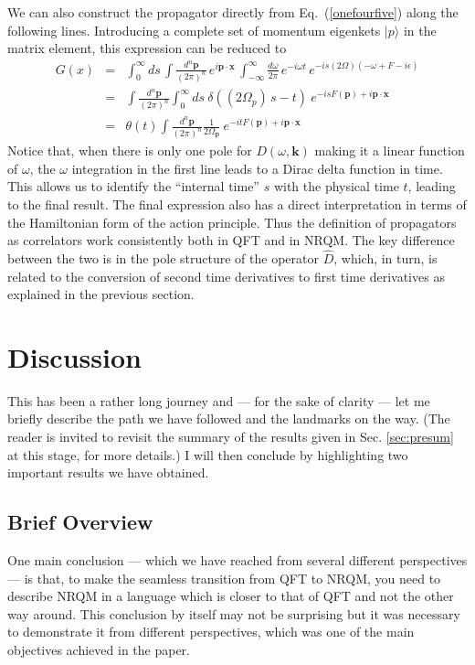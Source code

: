 \documentclass{article}
\def\eq#1{{Eq.~(\ref{#1})}}
\def\ket#1{|#1\rangle}                    %
\begin{document}
We can also construct the propagator directly from \eq{onefourfive} along the following lines. Introducing a complete set of momentum eigenkets $\ket{p}$ in the matrix element, this expression can be reduced to
\begin{eqnarray}
 G(x) &=& \int_0^\infty ds \, \int \frac{d^n\bm{p}}{(2\pi)^{n}} \, e^{i\bm{p\cdot x}}\, \int_{-\infty}^\infty \frac{d\omega}{2\pi} \, e^{-i\omega t}\, e^{-is(2\Omega) (-\omega + F - i\epsilon)}\\
 &=& \int \frac{d^n\bm{p}}{(2\pi)^{n}} \int_0^\infty ds\ \delta\left((2\Omega_p)\,s - t\right) \ e^{-isF(\bm{p}) + i \bm{p\cdot x}} \\
 &=&\theta(t)  \int \frac{d^n\bm{p}}{(2\pi)^{n}}\frac{1}{2\Omega_{\bm{p}}} \ e^{-it F(\bm{p}) +i \bm{p\cdot x}}
\end{eqnarray} 
Notice that, when there is only one pole for $D(\omega, \bm{k})$ making it a linear function of $\omega$, the $\omega$ integration in the first line leads to a Dirac delta function in time. This allows us to identify the ``internal time'' $s $ with the physical time $t$, leading to the final result. The final expression also has a direct interpretation in terms of the Hamiltonian form of the action principle. Thus the definition of propagators as correlators work consistently both in QFT and in NRQM. The key difference between the two is in the pole structure of the operator $\hat D$, which, in turn, is related to the conversion of second time derivatives to first time derivatives as explained in the previous section. 


\section{Discussion}
\label{sec:impli}

This has been a rather long journey and --- for the sake of clarity --- let me briefly describe the path we have followed and the landmarks on the way. (The reader is invited to revisit the summary of the results given in Sec. \ref{sec:presum} at this stage, for more details.) I will then conclude by highlighting two important results we have obtained.

\subsection{Brief Overview}

One main conclusion --- which we have reached from several different perspectives --- is that, to make the seamless transition from QFT to NRQM, you need to describe NRQM in a language
which is closer to that of QFT and  not the other way around. This conclusion by itself may not be surprising but it was necessary to demonstrate it from different perspectives, which was one of the main objectives achieved in the paper. 
\end{document}
